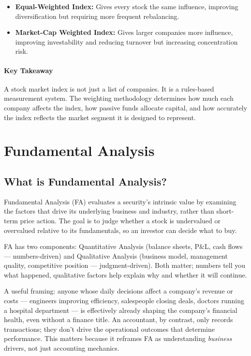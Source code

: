 \documentclass[12pt,openany]{book}
\begin{document}
\begin{itemize}[leftmargin=*]
    \item \textbf{Equal-Weighted Index:} Gives every stock the same influence, improving diversification but requiring more frequent rebalancing.
    \item \textbf{Market-Cap Weighted Index:} Gives larger companies more influence, improving investability and reducing turnover but increasing concentration risk.
\end{itemize}

\paragraph{Key Takeaway}
A stock market index is not just a list of companies. It is a rules-based measurement system. The weighting methodology determines how much each company affects the index, how passive funds allocate capital, and how accurately the index reflects the market segment it is designed to represent.

\section{Fundamental Analysis}

\subsection{What is Fundamental Analysis?}

Fundamental Analysis (FA) evaluates a security's intrinsic value by examining the factors that drive its underlying business and industry, rather than short-term price action. The goal is to judge whether a stock is undervalued or overvalued relative to its fundamentals, so an investor can decide what to buy.

FA has two components: Quantitative Analysis (balance sheets, P\&L, cash flows --- numbers-driven) and Qualitative Analysis (business model, management quality, competitive position --- judgment-driven). Both matter; numbers tell you what happened, qualitative factors help explain why and whether it will continue.

A useful framing: anyone whose daily decisions affect a company's revenue or costs --- engineers improving efficiency, salespeople closing deals, doctors running a hospital department --- is effectively already shaping the company's financial health, even without a finance title. An accountant, by contrast, only records transactions; they don't drive the operational outcomes that determine performance. This matters because it reframes FA as understanding \emph{business} drivers, not just accounting mechanics.
\end{document}
